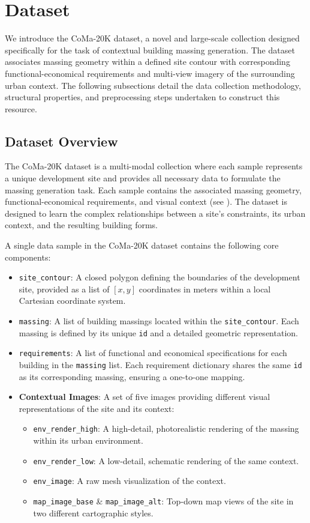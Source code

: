\section{Dataset}

We introduce the CoMa-20K dataset, a novel and large-scale collection designed specifically for the task of contextual building massing generation. The dataset associates massing geometry within a defined site contour with corresponding functional-economical requirements and multi-view imagery of the surrounding urban context. The following subsections detail the data collection methodology, structural properties, and preprocessing steps undertaken to construct this resource.

\subsection{Dataset Overview}


The CoMa-20K dataset is a multi-modal collection where each sample represents a unique development site and provides all necessary data to formulate the massing generation task. Each sample contains the associated massing geometry, functional-economical requirements, and visual context (see ). The dataset is designed to learn the complex relationships between a site's constraints, its urban context, and the resulting building forms.

A single data sample in the CoMa-20K dataset contains the following core components:

\begin{itemize}
    \item \texttt{site\_contour}: A closed polygon defining the boundaries of the development site, provided as a list of $[x, y]$ coordinates in meters within a local Cartesian coordinate system.
    \item \texttt{massing}: A list of building massings located within the \texttt{site\_contour}. Each massing is defined by its unique \texttt{id} and a detailed geometric representation.
    \item \texttt{requirements}: A list of functional and economical specifications for each building in the \texttt{massing} list. Each requirement dictionary shares the same \texttt{id} as its corresponding massing, ensuring a one-to-one mapping.
    \item \textbf{Contextual Images}: A set of five images providing different visual representations of the site and its context:
    \begin{itemize}
        \item \texttt{env\_render\_high}: A high-detail, photorealistic rendering of the massing within its urban environment.
        \item \texttt{env\_render\_low}: A low-detail, schematic rendering of the same context.
        \item \texttt{env\_image}: A raw mesh visualization of the context.
        \item \texttt{map\_image\_base} \& \texttt{map\_image\_alt}: Top-down map views of the site in two different cartographic styles.
    \end{itemize}
\end{itemize}


